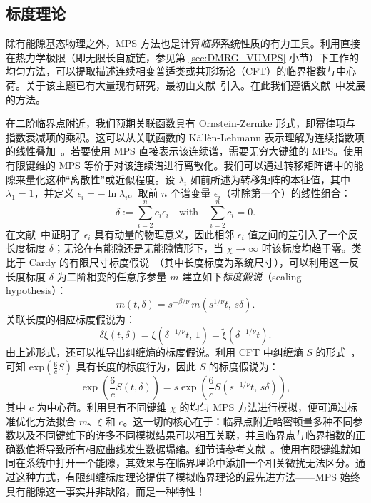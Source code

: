 \subsection{标度理论}\label{sec:scaling}
除有能隙基态物理之外，MPS 方法也是计算\emph{临界}系统性质的有力工具。利用直接在热力学极限（即无限长自旋链，参见第 \ref{sec:DMRG_VUMPS} 小节）下工作的均匀方法，可以提取描述连续相变普适类或共形场论（CFT）的临界指数与中心荷。关于该主题已有大量现有研究，最初由文献~\cite{Nishino1996,Tagliacozzo2007,Pollmann2009,Pirvu2012}引入。在此我们遵循文献~\cite{Zauner2015,Rams2018,Vanhecke2019}中发展的方法。

在二阶临界点附近，我们预期关联函数具有 Ornstein-Zernike 形式，即幂律项与指数衰减项的乘积。这可以从关联函数的 K{\"a}ll\`en-Lehmann 表示理解为连续指数项的线性叠加~\cite{Zauner2015}。若要使用 MPS 直接表示该连续谱，需要无穷大键维的 MPS。使用有限键维的 MPS 等价于对该连续谱进行离散化。我们可以通过转移矩阵谱中的能隙来量化这种“离散性”或近似程度。设 $\lambda_i$ 如前所述为转移矩阵的本征值，其中 $\lambda_1=1$，并定义 $\epsilon_i = - \ln\lambda_i$。取前 $n$ 个谱变量 $\epsilon_i$（排除第一个）的线性组合：
\begin{equation}
    \delta := \sum_{i=2}^{n} c_i \epsilon_i  \quad \text{with} \quad \sum_{i=2}^n c_i = 0.
\end{equation}
在文献~\cite{Zauner2015,Rams2018}中证明了 $\epsilon_i$ 具有动量的物理意义，因此相邻 $\epsilon_i$ 值之间的差引入了一个反长度标度 $\delta$；无论在有能隙还是无能隙情形下，当 $\chi\rightarrow\infty$ 时该标度均趋于零。类比于 Cardy 的有限尺寸标度假说~\cite{Cardy}（其中长度标度为系统尺寸），可以利用这一反长度标度 $\delta$ 为二阶相变的任意序参量 $m$ 建立如下\textit{标度假说}（scaling hypothesis）：
\begin{equation}
    m(t,\delta) = s^{-\beta/\nu} \, m\!\left( s^{1/\nu} t,\, s\delta \right).
\end{equation}
关联长度的相应标度假说为：
\begin{equation}
    \delta \xi(t,\delta) = \xi\!\left( \delta^{-1/\nu} t,\, 1 \right)
= \tilde{\xi}\!\left( \delta^{-1/\nu} t \right).
\end{equation}
由上述形式，还可以推导出纠缠熵的标度假说。利用 CFT 中纠缠熵 $S$ 的形式~\cite{Calabrese2004}，可知 $\text{exp}(\frac{6}{c}S)$ 具有长度的标度行为，因此 $S$ 的标度假说为：
\begin{equation}
    \exp\!\left( \frac{6}{c} S(t,\delta) \right)
= s \exp\!\left( \frac{6}{c} S\!\left( s^{-1/\nu} t,\, s\delta \right) \right),
\end{equation}
其中 $c$ 为中心荷。利用具有不同键维 $\chi$ 的均匀 MPS 方法进行模拟，便可通过标准优化方法拟合 $m$、$\xi$ 和 $c$。这一切的核心在于：临界点附近哈密顿量多种不同参数以及不同键维下的许多不同模拟结果可以相互关联，并且临界点与临界指数的正确数值将导致所有相应曲线发生数据塌缩。细节请参考文献~\cite{Vanhecke2019}。使用有限键维就如同在系统中打开一个能隙，其效果与在临界理论中添加一个相关微扰无法区分。通过这种方式，有限纠缠标度理论提供了模拟临界理论的最先进方法——MPS 始终具有能隙这一事实并非缺陷，而是一种特性！
